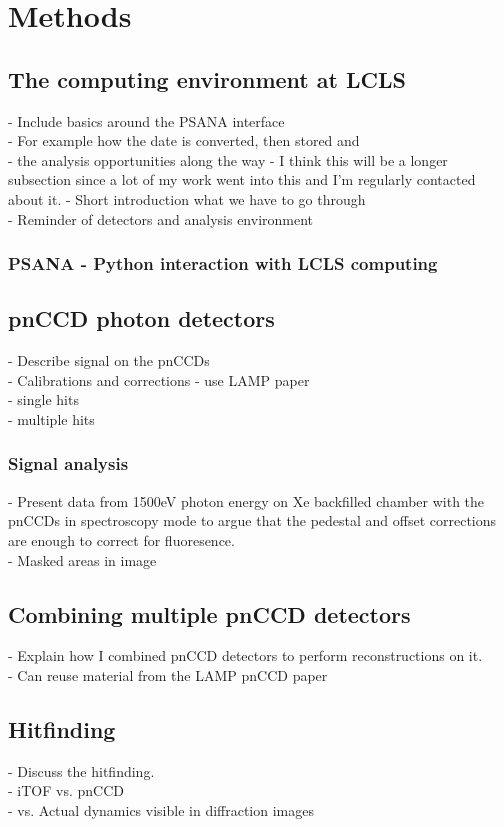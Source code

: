 \chapter{Methods}\label{ch:methods}
\section{The computing environment at LCLS}
- Include basics around the PSANA interface\\
- For example how the date is converted, then stored and\\
- the analysis opportunities along the way
- I think this will be a longer subsection since a lot of my work went into this and I'm regularly contacted about it.
- Short introduction what we have to go through\\
- Reminder of detectors and analysis environment
\subsection{PSANA - Python interaction with LCLS computing}
\section{pnCCD photon detectors}
- Describe signal on the pnCCDs\\
- Calibrations and corrections - use LAMP paper\\
- single hits\\
- multiple hits
\subsection{Signal analysis}
- Present data from 1500eV photon energy on Xe backfilled chamber with the pnCCDs in spectroscopy mode to argue that the pedestal and offset corrections are enough to correct for fluoresence.\\
- Masked areas in image
\section{Combining multiple pnCCD detectors}
- Explain how I combined pnCCD detectors to perform reconstructions on it.\\
- Can reuse material from the LAMP pnCCD paper
\section{Hitfinding}
- Discuss the hitfinding.\\
- iTOF vs. pnCCD\\
- vs. Actual dynamics visible in diffraction images

